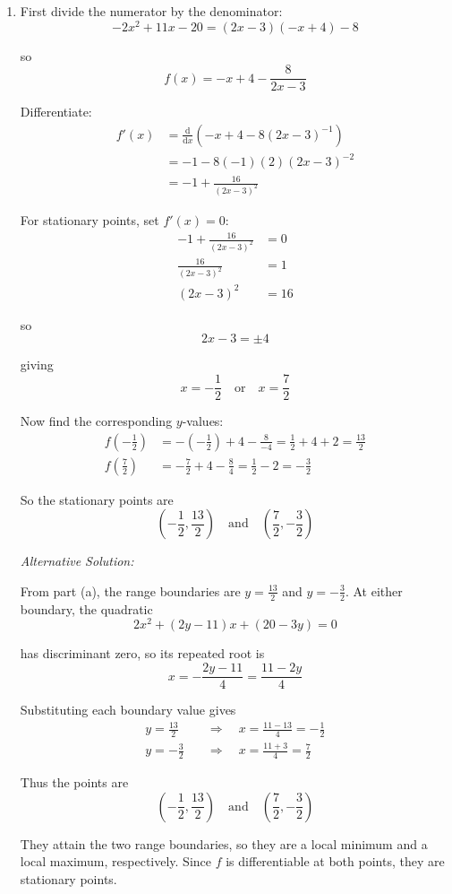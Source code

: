\documentclass[leqno]{article}
\begin{document}
\begin{enumerate}[
  label=\textbf{\arabic*.},
  leftmargin=*,
  topsep=0pt,
  partopsep=0pt,
  parsep=0pt
]
\begin{djsSolution}
\begin{enumerate}[label=\textbf{(\alph*)}]
  \item First divide the numerator by the denominator:
\[
-2x^2+11x-20=(2x-3)(-x+4)-8
\]

so
\[
f(x)=-x+4-\frac{8}{2x-3}
\]

Differentiate:
\begin{align*}
f'(x)&=\frac{\mathrm{d}}{\mathrm{d}x}\left(-x+4-8(2x-3)^{-1}\right)\\
&=-1-8(-1)(2)(2x-3)^{-2}\\
&=-1+\frac{16}{(2x-3)^2}
\end{align*}

For stationary points, set \(f'(x)=0\):
\begin{align*}
-1+\frac{16}{(2x-3)^2}&=0\\
\frac{16}{(2x-3)^2}&=1\\
(2x-3)^2&=16
\end{align*}

so
\[
2x-3=\pm 4
\]

giving
\[
x=-\frac12 \quad \text{or} \quad x=\frac72
\]

Now find the corresponding \(y\)-values:
\begin{align*}
f\left(-\frac12\right)&=-\left(-\frac12\right)+4-\frac{8}{-4}
=\frac12+4+2=\frac{13}{2}\\
f\left(\frac72\right)&=-\frac72+4-\frac{8}{4}
=\frac12-2=-\frac32
\end{align*}

So the stationary points are
\[
\left(-\frac12,\frac{13}{2}\right)
\quad \text{and} \quad
\left(\frac72,-\frac32\right)
\]

{\setlength{\parskip}{8pt}%
\textit{Alternative Solution:}

From part (a), the range boundaries are \(y=\frac{13}{2}\) and \(y=-\frac32\). At either boundary, the quadratic
\[
2x^2+(2y-11)x+(20-3y)=0
\]

has discriminant zero, so its repeated root is
\[
x=-\frac{2y-11}{4}=\frac{11-2y}{4}
\]

Substituting each boundary value gives
\begin{align*}
y=\frac{13}{2}&\quad\Longrightarrow\quad x=\frac{11-13}{4}=-\frac12\\
y=-\frac32&\quad\Longrightarrow\quad x=\frac{11+3}{4}=\frac72
\end{align*}

Thus the points are
\[
\left(-\frac12,\frac{13}{2}\right)
\quad\text{and}\quad
\left(\frac72,-\frac32\right)
\]

They attain the two range boundaries, so they are a local minimum and a local maximum, respectively. Since \(f\) is differentiable at both points, they are stationary points.
\par}


\end{enumerate}
\end{djsSolution}
\end{enumerate}
\end{document}
